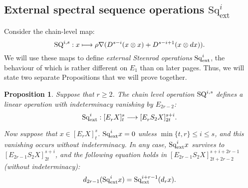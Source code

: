 \documentclass[11pt]{amsart} \renewcommand{\baselinestretch}{1.2}
\theoremstyle{plain}
\newtheorem{prop}[thm]{Proposition}
\numberwithin{equation}{section} %
\theoremstyle{plain}
\newtheorem{prop}[thm]{Proposition}
\numberwithin{equation}{chapter} %
\let\oldphi\phi
\let\phi\varphi
\renewcommand{\to}{\longrightarrow}
\newcommand{\calV}{\mathcal{V}}
\newcommand{\vect}[2]{\calV^{#1}_{#2}}
\newcommand{\Nabla}{\nabla}
\newcommand{\Sq}{\mathrm{Sq}}
\newcommand{\Edownup}[5]{[E_{#1}^{#2}#3]^{#4}_{#5}}
\newcommand{\dhor}{_\mathrm{h}}
\renewcommand{\mapsto}{\longmapsto}
\newcommand{\SubsectionOrSection}[1]{\subsection{#1}}
\begin{document}
\begin{second quadrant homotopy sseq operations}
\SubsectionOrSection{External spectral sequence operations $\Sq_\mathrm{ext}^i$}
\label{External spectral sequence operations Sq}
Consider the chain-level map:
\[\textup{SQ}^{i,s}:x\mapsto \rho\Nabla (D^{s-i}(x\otimes x)+D^{s-i+1}(x\otimes dx)).\]
We will use these maps to define \emph{external Steenrod operations} $\Sq^i_\textup{ext}$, the behaviour of which is rather different on $E_1$ than on later pages. Thus, we will state two separate Propositions that we will prove together. 

\begin{prop}
\label{prop on e1 steens 1}
Suppose that  $r\geq2$. The chain level operation $\textup{SQ}^{i,s}$ defines a linear operation  with indeterminacy vanishing by $E_{2r-2}$:
\[\Sq^i_\textup{ext}:\Edownup{r}{}{X}{s}{t}\to \Edownup{r}{}{S_2X}{s+i}{2t}.\]

Now suppose that $x\in\Edownup{r}{}{X}{s}{t}$. $\Sq^i_\textup{ext}x=0$ unless $\min\{t,r\}\leq i\leq s$,  and this vanishing occurs without indeterminacy.
In any case, $\Sq^i_\textup{ext}x$ survives to $\Edownup{2r-1}{}{S_2X}{s+i}{2t}$, and the following equation holds in $\Edownup{2r-1}{}{S_2X}{s+i+2r-1}{2t+2r-2}$ (without indeterminacy): \[d_{2r-1}(\Sq^i_\textup{ext}x)=\Sq^{i+r-1}_\textup{ext}(d_rx).\]


\end{prop}
\end{second quadrant homotopy sseq operations}
\end{document}
